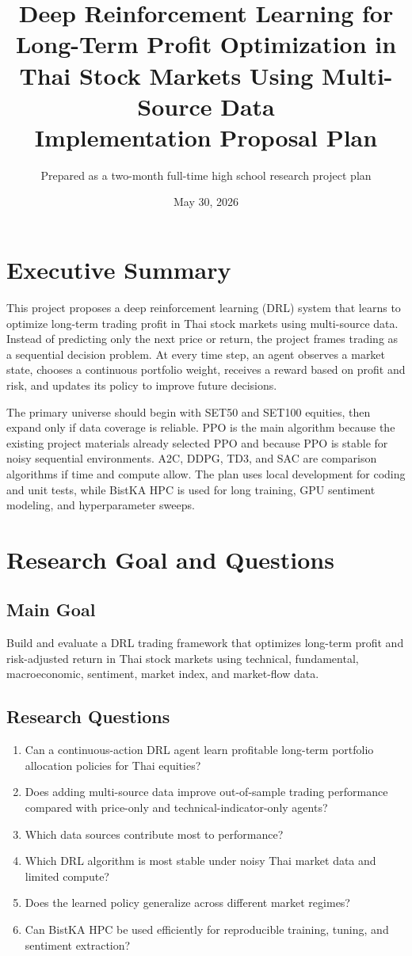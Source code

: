 \documentclass[11pt]{article}
\title{Deep Reinforcement Learning for Long-Term Profit Optimization in Thai Stock Markets Using Multi-Source Data\\Implementation Proposal Plan}
\author{Prepared as a two-month full-time high school research project plan}
\date{May 30, 2026}
\begin{document}
\maketitle

\section{Executive Summary}
This project proposes a deep reinforcement learning (DRL) system that learns to optimize long-term trading profit in Thai stock markets using multi-source data. Instead of predicting only the next price or return, the project frames trading as a sequential decision problem. At every time step, an agent observes a market state, chooses a continuous portfolio weight, receives a reward based on profit and risk, and updates its policy to improve future decisions.

The primary universe should begin with SET50 and SET100 equities, then expand only if data coverage is reliable. PPO is the main algorithm because the existing project materials already selected PPO and because PPO is stable for noisy sequential environments. A2C, DDPG, TD3, and SAC are comparison algorithms if time and compute allow. The plan uses local development for coding and unit tests, while BistKA HPC is used for long training, GPU sentiment modeling, and hyperparameter sweeps.

\section{Research Goal and Questions}
\subsection{Main Goal}
Build and evaluate a DRL trading framework that optimizes long-term profit and risk-adjusted return in Thai stock markets using technical, fundamental, macroeconomic, sentiment, market index, and market-flow data.

\subsection{Research Questions}
\begin{enumerate}
\item Can a continuous-action DRL agent learn profitable long-term portfolio allocation policies for Thai equities?
\item Does adding multi-source data improve out-of-sample trading performance compared with price-only and technical-indicator-only agents?
\item Which data sources contribute most to performance?
\item Which DRL algorithm is most stable under noisy Thai market data and limited compute?
\item Does the learned policy generalize across different market regimes?
\item Can BistKA HPC be used efficiently for reproducible training, tuning, and sentiment extraction?
\end{enumerate}
\end{document}
